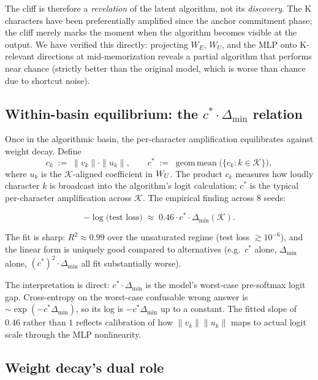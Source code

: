 The cliff is therefore a \emph{revelation} of the latent algorithm, not its
\emph{discovery}.  The K characters have been preferentially amplified
since the anchor commitment phase; the cliff merely marks the moment when
the algorithm becomes visible at the output.  We have verified this directly:
projecting $W_E$, $W_U$, and the MLP onto K-relevant directions at
mid-memorization reveals a partial algorithm that performs near chance
(strictly better than the original model, which is worse than chance due to
shortcut noise).

\subsection{Within-basin equilibrium: the $c^* \cdot \Delta_{\min}$ relation}
\label{subsec:bgeo-cgap}

Once in the algorithmic basin, the per-character amplification equilibrates
against weight decay.  Define
\begin{equation}
  c_k \;:=\; \|v_k\| \cdot \|u_k\|,
  \qquad
  c^* \;:=\; \operatorname{geom\,mean}\bigl(\{c_k : k \in \mathcal K\}\bigr),
\end{equation}
where $u_k$ is the $\mathcal K$-aligned coefficient in $W_U$.  The product
$c_k$ measures how loudly character $k$ is broadcast into the algorithm's
logit calculation; $c^*$ is the typical per-character amplification across
$\mathcal K$.  The empirical finding across $8$ seeds:

\begin{equation}
  -\log\bigl(\text{test loss}\bigr)
    \;\approx\; 0.46 \cdot c^* \cdot \Delta_{\min}(\mathcal K).
  \label{eq:bgeo-cgap}
\end{equation}

\noindent The fit is sharp: $R^2 \approx 0.99$ over the unsaturated regime
(test loss $\gtrsim 10^{-6}$), and the linear form is uniquely good
compared to alternatives (e.g.\ $c^*$ alone, $\Delta_{\min}$ alone,
$(c^*)^2 \cdot \Delta_{\min}$ all fit substantially worse).

The interpretation is direct: $c^* \cdot \Delta_{\min}$ is the model's
worst-case pre-softmax logit gap.  Cross-entropy on the worst-case
confusable wrong answer is $\sim \exp(-c^* \Delta_{\min})$, so its log is
$-c^* \Delta_{\min}$ up to a constant. The fitted slope of $0.46$ rather
than $1$ reflects calibration of how $\|v_k\|\|u_k\|$ maps to actual logit
scale through the MLP nonlinearity.

\subsection{Weight decay's dual role}
\label{subsec:bgeo-wd-dual}

